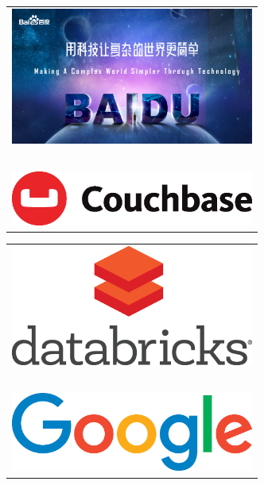 \begin{tabular}{C{\linewidth}}
\includegraphics[width=80mm]{ads/baidu.jpg} \\ ~ \\
\includegraphics[width=80mm]{ads/couchbase.eps}

\end{tabular}


\begin{tabular}{C{\linewidth}}
\includegraphics[width=80mm]{ads/databricks.eps} \\ ~ \\
\includegraphics[width=80mm]{ads/google.eps}

\end{tabular}

